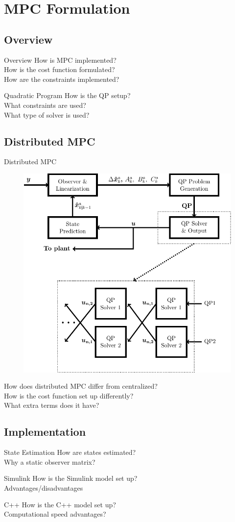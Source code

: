 \section{MPC Formulation}

\subsection{Overview}
\begin{frame}{Overview}
  How is MPC implemented?\\
  How is the cost function formulated?\\
  How are the constraints implemented?
\end{frame}

\begin{frame}{Quadratic Program}
  How is the QP setup?\\
  What constraints are used?\\
  What type of solver is used?
\end{frame}

\subsection{Distributed MPC}
\begin{frame}{Distributed MPC}
  \begin{figure}[H]
    \centering
    \includegraphics[width=.5\linewidth]{figures/algorithm.pdf}
  \end{figure}
  How does distributed MPC differ from centralized?\\
  How is the cost function set up differently?\\
  What extra terms does it have?
\end{frame}

\subsection{Implementation}
\begin{frame}{State Estimation}
  How are states estimated?\\
  Why a static observer matrix?
\end{frame}

\begin{frame}{Simulink}
  How is the Simulink model set up?\\
  Advantages/disadvantages
\end{frame}

\begin{frame}{C++}
  How is the C++ model set up?\\
  Computational speed advantages?
\end{frame}


